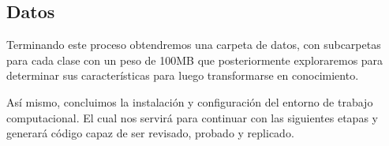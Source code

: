 \subsection{Datos}

Terminando este proceso obtendremos una carpeta de datos, con subcarpetas para
cada clase con un peso de 100MB que posteriormente exploraremos para determinar
sus características para luego transformarse en conocimiento.

Así mismo, concluimos la instalación y configuración del entorno de trabajo
computacional. El cual nos servirá para continuar con las siguientes etapas y
generará código capaz de ser revisado, probado y replicado. 